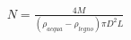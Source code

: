 \documentclass[preview]{standalone}
\begin{document}
\begin{align*}
N = \tfrac{4M}{(\rho_{acqua}-\rho_{legno})\pi D^2 L}
\end{align*}
\end{document}
